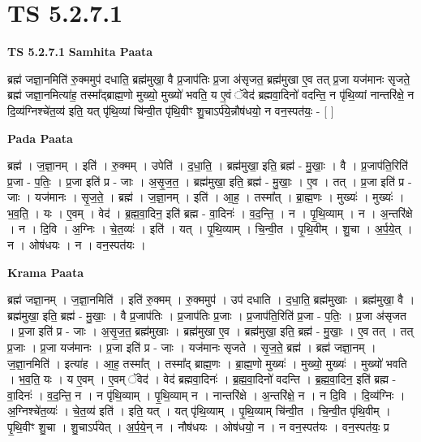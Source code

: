 \documentclass[17pt]{extarticle}
\begin{document}
\section{ TS 5.2.7.1 }

\textbf{TS 5.2.7.1 } \newline
\textbf{Samhita Paata} \newline

ब्रह्म॑ जज्ञा॒नमिति॑ रु॒क्ममुप॑ दधाति॒ ब्रह्म॑मुखा॒ वै प्र॒जाप॑तिः प्र॒जा अ॑सृजत॒ ब्रह्म॑मुखा ए॒व तत् प्र॒जा यज॑मानः सृजते॒ ब्रह्म॑ जज्ञा॒नमित्या॑ह॒ तस्मा᳚द्ब्राह्म॒णो मुख्यो॒ मुख्यो॑ भवति॒ य ए॒वं ॅवेद॑ ब्रह्मवा॒दिनो॑ वदन्ति॒ न पृ॑थि॒व्यां नान्तरि॑क्षे॒ न दि॒व्य॑ग्निश्चे॑त॒व्य॑ इति॒ यत् पृ॑थि॒व्यां चि॑न्वी॒त पृ॑थि॒वीꣳ शु॒चाऽर्प॑ये॒न्नौष॑धयो॒ न वन॒स्पत॑यः॒ - [  ] \newline

\textbf{Pada Paata} \newline

ब्रह्म॑ । ज॒ज्ञा॒नम् । इति॑ । रु॒क्मम् । उपेति॑ । द॒धा॒ति॒ । ब्रह्म॑मुखा॒ इति॒ ब्रह्म॑ - मु॒खाः॒ । वै । प्र॒जाप॑ति॒रिति॑ प्र॒जा - प॒तिः॒ । प्र॒जा इति॑ प्र - जाः । अ॒सृ॒ज॒त॒ । ब्रह्म॑मुखा॒ इति॒ ब्रह्म॑ - मु॒खाः॒ । ए॒व । तत् । प्र॒जा इति॑ प्र - जाः । यज॑मानः । सृ॒ज॒ते॒ । ब्रह्म॑ । ज॒ज्ञा॒नम् । इति॑ । आ॒ह॒ । तस्मा᳚त् । ब्रा॒ह्म॒णः । मुख्यः॑ । मुख्यः॑ । भ॒व॒ति॒ । यः । ए॒वम् । वेद॑ । ब्र॒ह्म॒वा॒दिन॒ इति॑ ब्रह्म - वा॒दिनः॑ । व॒द॒न्ति॒ । न । पृ॒थि॒व्याम् । न । अ॒न्तरि॑क्षे । न । दि॒वि । अ॒ग्निः । चे॒त॒व्यः॑ । इति॑ । यत् । पृ॒थि॒व्याम् । चि॒न्वी॒त । पृ॒थि॒वीम् । शु॒चा । अ॒र्प॒ये॒त् । न । ओष॑धयः । न । वन॒स्पत॑यः ।  \newline


\textbf{Krama Paata} \newline

ब्रह्म॑ जज्ञा॒नम् । ज॒ज्ञा॒नमिति॑ । इति॑ रु॒क्मम् । रु॒क्ममुप॑ । उप॑ दधाति । द॒धा॒ति॒ ब्रह्म॑मुखाः । ब्रह्म॑मुखा॒ वै । ब्रह्म॑मुखा॒ इति॒ ब्रह्म॑ - मु॒खाः॒ । वै प्र॒जाप॑तिः । प्र॒जाप॑तिः प्र॒जाः । प्र॒जाप॑ति॒रिति॑ प्र॒जा - प॒तिः॒ । प्र॒जा अ॑सृजत । प्र॒जा इति॑ प्र - जाः । अ॒सृ॒ज॒त॒ ब्रह्म॑मुखाः । ब्रह्म॑मुखा ए॒व । ब्रह्म॑मुखा॒ इति॒ ब्रह्म॑ - मु॒खाः॒ । ए॒व तत् । तत् प्र॒जाः । प्र॒जा यज॑मानः । प्र॒जा इति॑ प्र - जाः । यज॑मानः सृजते । सृ॒ज॒ते॒ ब्रह्म॑ । ब्रह्म॑ जज्ञा॒नम् । ज॒ज्ञा॒नमिति॑ । इत्या॑ह । आ॒ह॒ तस्मा᳚त् । तस्मा᳚द् ब्राह्म॒णः । ब्रा॒ह्म॒णो मुख्यः॑ । मुख्यो॒ मुख्यः॑ । मुख्यो॑ भवति । भ॒व॒ति॒ यः । य ए॒वम् । ए॒वम् ॅवेद॑ । वेद॑ ब्रह्मवा॒दिनः॑ । ब्र॒ह्म॒वा॒दिनो॑ वदन्ति । ब्र॒ह्म॒वा॒दिन॒ इति॑ ब्रह्म - वा॒दिनः॑ । व॒द॒न्ति॒ न । न पृ॑थि॒व्याम् । पृ॒थि॒व्याम् न । नान्तरि॑क्षे । अ॒न्तरि॑क्षे॒ न । न दि॒वि । दि॒व्य॑ग्निः । अ॒ग्निश्चे॑त॒व्यः॑ । चे॒त॒व्य॑ इति॑ । इति॒ यत् । यत् पृ॑थि॒व्याम् । पृ॒थि॒व्याम् चि॑न्वी॒त । चि॒न्वी॒त पृ॑थि॒वीम् । पृ॒थि॒वीꣳ शु॒चा । शु॒चाऽर्प॑येत् । अ॒र्प॒ये॒न् न । नौष॑धयः । ओष॑धयो॒ न । न वन॒स्पत॑यः । वन॒स्पत॑यः॒ प्र \newline
\end{document}
